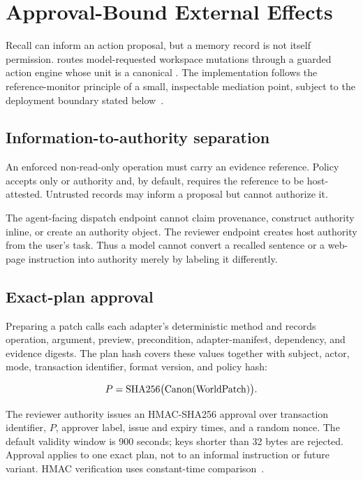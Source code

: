 \section{Approval-Bound External Effects}
\label{sec:effects}

Recall can inform an action proposal, but a memory record is not itself permission. \system{} routes model-requested workspace mutations through a guarded action engine whose unit is a canonical . The implementation follows the reference-monitor principle of a small, inspectable mediation point, subject to the deployment boundary stated below~\cite{saltzer1975protection}.

\subsection{Information-to-authority separation}

An enforced non-read-only operation must carry an  evidence reference. Policy accepts only  or  authority and, by default, requires the reference to be host-attested. Untrusted records may inform a proposal but cannot authorize it.

The agent-facing dispatch endpoint cannot claim  provenance, construct authority inline, or create an authority object. The reviewer endpoint creates host authority from the user's task. Thus a model cannot convert a recalled sentence or a web-page instruction into authority merely by labeling it differently.

\subsection{Exact-plan approval}

Preparing a patch calls each adapter's deterministic  method and records operation, argument, preview, precondition, adapter-manifest, dependency, and evidence digests. The plan hash covers these values together with subject, actor, mode, transaction identifier, format version, and policy hash:

\begin{equation}
P=\operatorname{SHA256}\bigl(\operatorname{Canon}(\mathrm{WorldPatch})\bigr).
\end{equation}

The reviewer authority issues an HMAC-SHA256 approval over transaction identifier, $P$, approver label, issue and expiry times, and a random nonce. The default validity window is 900 seconds; keys shorter than 32 bytes are rejected. Approval applies to one exact plan, not to an informal instruction or future variant. HMAC verification uses constant-time comparison~\cite{krawczyk1997hmac}.

